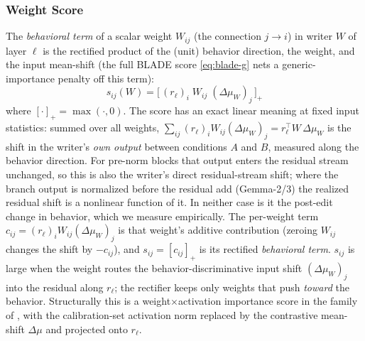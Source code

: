 \subsubsection{Weight Score}
The \emph{behavioral term} of a scalar weight $W_{ij}$ (the connection $j\to i$) in writer $W$ of layer $\ell$ is the rectified product of the (unit) behavior direction, the weight, and the input mean-shift (the full BLADE score \eqref{eq:blade-g} nets a generic-importance penalty off this term):
\begin{equation}
  s_{ij}(W)=\bigl[\,(r_\ell)_i\; W_{ij}\; (\Delta\mu_W)_j\,\bigr]_+ 
  \label{eq:score}
\end{equation}
where $[\cdot]_+=\max(\cdot,0)$. The score has an exact linear meaning at fixed input statistics: summed over all weights, $\sum_{ij}(r_\ell)_i W_{ij}(\Delta\mu_W)_j=r_\ell^{\top} W\,\Delta\mu_W$ is the shift in the writer's \emph{own output} between conditions $A$ and $B$, measured along the behavior direction. For pre-norm blocks that output enters the residual stream unchanged, so this is also the writer's direct residual-stream shift; where the branch output is normalized before the residual add (Gemma-2/3) the realized residual shift is a nonlinear function of it. In neither case is it the post-edit change in behavior, which we measure empirically. The per-weight term $c_{ij}=(r_\ell)_i W_{ij}(\Delta\mu_W)_j$ is that weight's additive contribution (zeroing $W_{ij}$ changes the shift by $-c_{ij}$), and $s_{ij}=[c_{ij}]_+$ is its rectified \emph{behavioral term}. $s_{ij}$ is large when the weight routes the behavior-discriminative input shift $(\Delta\mu_W)_j$ into the residual along $r_\ell$; the rectifier keeps only weights that push \emph{toward} the behavior. Structurally this is a weight$\times$activation importance score in the family of \cite{sun2023wanda}, with the calibration-set activation norm replaced by the contrastive mean-shift $\Delta\mu$ and projected onto $r_\ell$.

